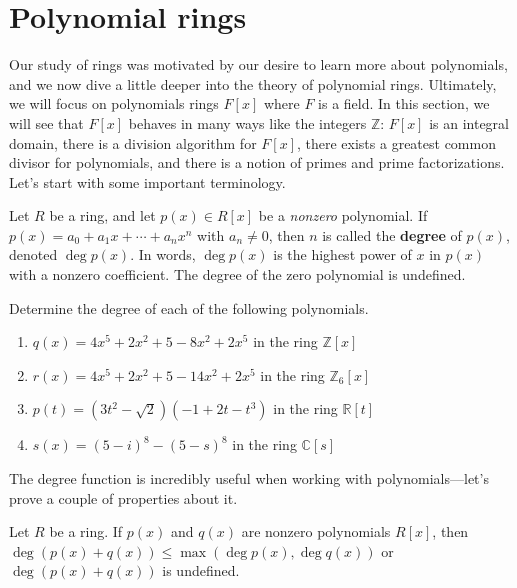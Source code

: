 \section{Polynomial rings}
Our study of rings was motivated by our desire to learn more about polynomials, and we now dive a little deeper into the theory of polynomial rings. Ultimately, we will focus on polynomials rings $F[x]$ where $F$ is a field. In this section, we will see that $F[x]$ behaves in many ways like the integers $\mathbb{Z}$: $F[x]$ is an integral domain, there is a division algorithm for $F[x]$, there exists a greatest common divisor for polynomials, and there is a notion of primes and prime factorizations. 
Let's start with some important terminology.

\begin{definition}
Let $R$ be a ring, and let  $p(x)\in R[x]$ be a \emph{nonzero} polynomial. If $p(x) = a_0 + a_1x + \cdots + a_nx^n$ with $a_n \neq 0$, then $n$ is called the \textbf{degree} of $p(x)$, denoted $\deg p(x)$. In words, $\deg p(x)$ is the highest power of $x$ in $p(x)$ with a nonzero coefficient. The degree of the zero polynomial is undefined.
\end{definition}

\begin{problem}
Determine the degree of each of the following polynomials.
\begin{enumerate}
\item $q(x) = 4x^5 + 2x^2 + 5 -8x^2 +2x^5$ in the ring $\mathbb{Z}[x]$
\item $r(x) = 4x^5 + 2x^2 + 5 -14x^2 +2x^5$ in the ring $\mathbb{Z}_6[x]$
\item $p(t) = (3t^2-\sqrt{2})(-1 + 2t -t^3)$ in the ring $\mathbb{R}[t]$
\item $s(x) = (5-i)^8 - (5-s)^8$ in the ring $\mathbb{C}[s]$
\end{enumerate}
\end{problem}

The degree function is incredibly useful when working with polynomials---let's prove a couple of properties about it. 

\begin{theorem}\label{thm.DegreePolySum}
Let $R$ be a ring. If $p(x)$ and $q(x)$ are nonzero polynomials $R[x]$, then $\deg(p(x) + q(x)) \le \max(\deg p(x),\deg q(x))$ or  $\deg(p(x) + q(x))$ is undefined.
\end{theorem}

